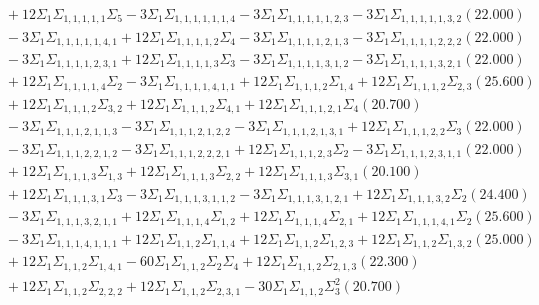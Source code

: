 \documentclass[12pt]{article}
\begin{document}
\begin{landscape}
\begin{align*}
		&\quad\quad +12\Sigma_{1}\Sigma_{1,1,1,1,1}\Sigma_{5}-3\Sigma_{1}\Sigma_{1,1,1,1,1,1,4}-3\Sigma_{1}\Sigma_{1,1,1,1,1,2,3}-3\Sigma_{1}\Sigma_{1,1,1,1,1,3,2}(22.000) \\ 
		&\quad\quad -3\Sigma_{1}\Sigma_{1,1,1,1,1,4,1}+12\Sigma_{1}\Sigma_{1,1,1,1,2}\Sigma_{4}-3\Sigma_{1}\Sigma_{1,1,1,1,2,1,3}-3\Sigma_{1}\Sigma_{1,1,1,1,2,2,2}(22.000) \\ 
		&\quad\quad -3\Sigma_{1}\Sigma_{1,1,1,1,2,3,1}+12\Sigma_{1}\Sigma_{1,1,1,1,3}\Sigma_{3}-3\Sigma_{1}\Sigma_{1,1,1,1,3,1,2}-3\Sigma_{1}\Sigma_{1,1,1,1,3,2,1}(22.000) \\ 
		&\quad\quad +12\Sigma_{1}\Sigma_{1,1,1,1,4}\Sigma_{2}-3\Sigma_{1}\Sigma_{1,1,1,1,4,1,1}+12\Sigma_{1}\Sigma_{1,1,1,2}\Sigma_{1,4}+12\Sigma_{1}\Sigma_{1,1,1,2}\Sigma_{2,3}(25.600) \\ 
		&\quad\quad +12\Sigma_{1}\Sigma_{1,1,1,2}\Sigma_{3,2}+12\Sigma_{1}\Sigma_{1,1,1,2}\Sigma_{4,1}+12\Sigma_{1}\Sigma_{1,1,1,2,1}\Sigma_{4}(20.700) \\ 
		&\quad\quad -3\Sigma_{1}\Sigma_{1,1,1,2,1,1,3}-3\Sigma_{1}\Sigma_{1,1,1,2,1,2,2}-3\Sigma_{1}\Sigma_{1,1,1,2,1,3,1}+12\Sigma_{1}\Sigma_{1,1,1,2,2}\Sigma_{3}(22.000) \\ 
		&\quad\quad -3\Sigma_{1}\Sigma_{1,1,1,2,2,1,2}-3\Sigma_{1}\Sigma_{1,1,1,2,2,2,1}+12\Sigma_{1}\Sigma_{1,1,1,2,3}\Sigma_{2}-3\Sigma_{1}\Sigma_{1,1,1,2,3,1,1}(22.000) \\ 
		&\quad\quad +12\Sigma_{1}\Sigma_{1,1,1,3}\Sigma_{1,3}+12\Sigma_{1}\Sigma_{1,1,1,3}\Sigma_{2,2}+12\Sigma_{1}\Sigma_{1,1,1,3}\Sigma_{3,1}(20.100) \\ 
		&\quad\quad +12\Sigma_{1}\Sigma_{1,1,1,3,1}\Sigma_{3}-3\Sigma_{1}\Sigma_{1,1,1,3,1,1,2}-3\Sigma_{1}\Sigma_{1,1,1,3,1,2,1}+12\Sigma_{1}\Sigma_{1,1,1,3,2}\Sigma_{2}(24.400) \\ 
		&\quad\quad -3\Sigma_{1}\Sigma_{1,1,1,3,2,1,1}+12\Sigma_{1}\Sigma_{1,1,1,4}\Sigma_{1,2}+12\Sigma_{1}\Sigma_{1,1,1,4}\Sigma_{2,1}+12\Sigma_{1}\Sigma_{1,1,1,4,1}\Sigma_{2}(25.600) \\ 
		&\quad\quad -3\Sigma_{1}\Sigma_{1,1,1,4,1,1,1}+12\Sigma_{1}\Sigma_{1,1,2}\Sigma_{1,1,4}+12\Sigma_{1}\Sigma_{1,1,2}\Sigma_{1,2,3}+12\Sigma_{1}\Sigma_{1,1,2}\Sigma_{1,3,2}(25.000) \\ 
		&\quad\quad +12\Sigma_{1}\Sigma_{1,1,2}\Sigma_{1,4,1}-60\Sigma_{1}\Sigma_{1,1,2}\Sigma_{2}\Sigma_{4}+12\Sigma_{1}\Sigma_{1,1,2}\Sigma_{2,1,3}(22.300) \\ 
		&\quad\quad +12\Sigma_{1}\Sigma_{1,1,2}\Sigma_{2,2,2}+12\Sigma_{1}\Sigma_{1,1,2}\Sigma_{2,3,1}-30\Sigma_{1}\Sigma_{1,1,2}\Sigma_{3}^{2}(20.700) \\ 

\end{align*}
\end{landscape}
\end{document}
